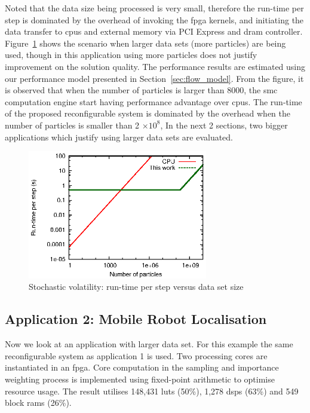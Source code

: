 Noted that the data size being processed is very small, therefore the run-time per step is dominated by the overhead of invoking the \gls{fpga} kernels, and initiating the data transfer to \glspl{cpu} and external memory via PCI Express and \gls{dram} controller.
Figure~\ref{fig:est_sv} shows the scenario when larger data sets (more particles) are being used, though in this application using more particles does not justify improvement on the solution quality.
The performance results are estimated using our performance model presented in Section~\ref{sec:flow_model}.
From the figure, it is observed that when the number of particles is larger than 8000, the \gls{smc} computation engine start having performance advantage over \glspl{cpu}.
The run-time of the proposed reconfigurable system is dominated by the overhead when the number of particles is smaller than 2 $\times 10^8$, 
In the next 2 sections, two bigger applications which justify using larger data sets are evaluated.

\begin{figure}[t!]
\centering
\includegraphics[width=0.7\textwidth]{5_tool/figures/fig_est_sv}
\caption{Stochastic volatility: run-time per step versus data set size}
\label{fig:est_sv}
\end{figure}

\subsection{Application 2: Mobile Robot Localisation}

Now we look at an application with larger data set.
For this example the same reconfigurable system as application 1 is used. 
Two processing cores are instantiated in an \gls{fpga}.
Core computation in the sampling and importance weighting process is implemented using fixed-point arithmetic to optimise resource usage.
The result utilises 148,431 \glspl{lut} (50\%), 1,278 \glspl{dsp} (63\%) and 549 block \glspl{ram} (26\%).

